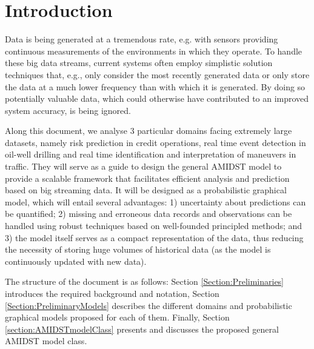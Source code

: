 \section{Introduction}


Data is being generated at a tremendous rate, e.g. with sensors providing continuous measurements of the environments in which they operate. To handle these big data streams, current systems often employ simplistic solution techniques that, e.g., only consider the most recently generated data or only store the data at a much lower frequency than with which it is generated. By doing so potentially valuable data, which could otherwise have contributed to an improved system accuracy, is being ignored. 

Along this document, we analyse 3 particular domains facing extremely large datasets, namely risk prediction in credit operations, real time event detection in oil-well drilling and real time identification and interpretation of maneuvers in traffic. They will serve as a guide to design the general AMIDST model to provide a scalable framework that facilitates efficient analysis and prediction based on big streaming data. It will be designed as a probabilistic graphical model, which will entail several advantages: 1) uncertainty about predictions can be quantified; 2) missing and erroneous data records and observations can be handled using robust techniques based on well-founded principled methods; and 3) the model itself serves as a compact representation of the data, thus reducing the necessity of storing huge volumes of historical data (as the model is continuously updated with new data).


The structure of the document is as follows: Section \ref{Section:Preliminaries} introduces the required background and notation, Section \ref{Section:PreliminaryModels} describes the different domains and probabilistic graphical models proposed for each of them. Finally, Section \ref{section:AMIDSTmodelClass} presents and discusses the proposed general AMIDST model class.